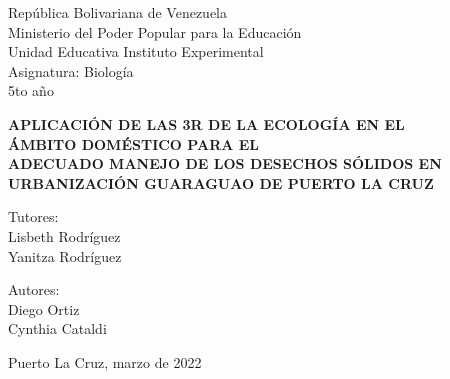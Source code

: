 \begin{center}
República Bolivariana de Venezuela\\[0.1cm] 
Ministerio del Poder Popular para la Educación\\[0.1cm]
Unidad Educativa Instituto Experimental\\[0.1cm] 
Asignatura: Biología\\[0.1cm] 
5to año\\[0.1cm] 
\end{center}

\begin{center}
    \textbf{\large{APLICACIÓN DE LAS 3R DE LA ECOLOGÍA EN EL\\
ÁMBITO DOMÉSTICO PARA EL\\ 
ADECUADO MANEJO DE LOS DESECHOS SÓLIDOS EN\\[0.2cm]
URBANIZACIÓN GUARAGUAO DE PUERTO LA CRUZ}}\\[0.1cm]
\end{center}

\vspace*{0.3cm}
\begin{flushright}
\textup{Tutores:}\\
\textup{Lisbeth Rodríguez \\ Yanitza Rodríguez}
\end{flushright}

\begin{flushright}
Autores: \\
Diego Ortiz\\
Cynthia Cataldi
\end{flushright}
\begin{flushright}
Puerto La Cruz, marzo de 2022
\end{flushright}
\vspace*{1cm}


